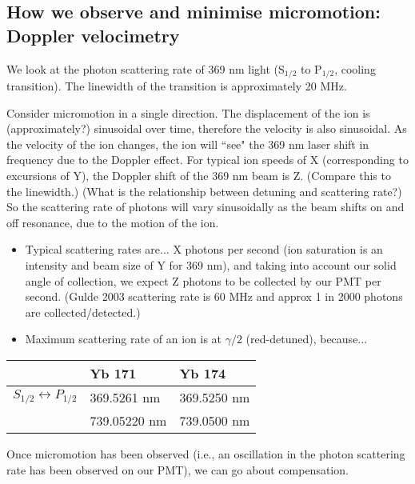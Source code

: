 \documentclass{article}
\begin{document}
\subsection*{How we observe and minimise micromotion: Doppler velocimetry}

We look at the photon scattering rate of 369 nm light (S$_{1/2}$ to P$_{1/2}$, cooling transition). The linewidth of the transition is approximately 20 MHz.  

Consider micromotion in a single direction. The displacement of the ion is (approximately?) sinusoidal over time, therefore the velocity is also sinusoidal. As the velocity of the ion changes, the ion will ``see" the 369 nm laser shift in frequency due to the Doppler effect. For typical ion speeds of X (corresponding to excursions of Y), the Doppler shift of the 369 nm beam is Z. (Compare this to the linewidth.) (What is the relationship between detuning and scattering rate?) So the scattering rate of photons will vary sinusoidally as the beam shifts on and off resonance, due to the motion of the ion.

\begin{itemize}
\item Typical scattering rates are... X photons per second (ion saturation is an intensity and beam size of Y for 369 nm), and taking into account our solid angle of collection, we expect Z photons to be collected by our PMT per second. (Gulde 2003 scattering rate is 60 MHz and approx 1 in 2000 photons are collected/detected.)
\item Maximum scattering rate of an ion is at $\gamma /2$ (red-detuned), because...
\end{itemize}

\vspace{0mm}
\begin{center}
\begin{tabular}{l l l} \toprule
& \textbf{Yb 171} & \textbf{Yb 174} \\ \midrule
$S_{1/2} \leftrightarrow P_{1/2}$ & 369.5261 nm & 369.5250 nm \\
 & 739.05220 nm & 739.0500 nm \\  
\bottomrule
\end{tabular}
\end{center}

Once micromotion has been observed (i.e., an oscillation in the photon scattering rate has been observed on our PMT), we can go about compensation.

\end{document}

